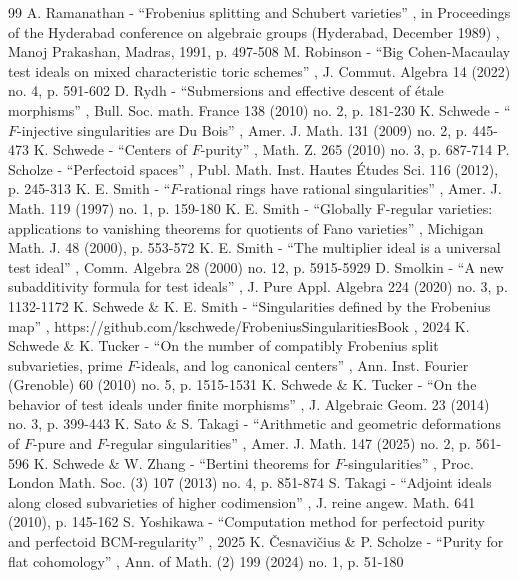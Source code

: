 \documentclass[11pt]{article}
\theoremstyle{plain}
\theoremstyle{definition}
\numberwithin{equation}{theorem}
\begin{document}
\begin{thebibliography}{99}
 A. Ramanathan - “Frobenius splitting and Schubert varieties” , in Proceedings of the Hyderabad conference on algebraic groups (Hyderabad, December 1989) , Manoj Prakashan, Madras, 1991, p. 497-508
 M. Robinson - “Big Cohen-Macaulay test ideals on mixed characteristic toric schemes” , J. Commut. Algebra 14 (2022) no. 4, p. 591-602
 D. Rydh - “Submersions and effective descent of étale morphisms” , Bull. Soc. math. France 138 (2010) no. 2, p. 181-230
 K. Schwede - “$F$-injective singularities are Du Bois” , Amer. J. Math. 131 (2009) no. 2, p. 445-473
 K. Schwede - “Centers of $F$-purity” , Math. Z. 265 (2010) no. 3, p. 687-714
 P. Scholze - “Perfectoid spaces” , Publ. Math. Inst. Hautes Études Sci. 116 (2012), p. 245-313
 K. E. Smith - “$F$-rational rings have rational singularities” , Amer. J. Math. 119 (1997) no. 1, p. 159-180
 K. E. Smith - “Globally F-regular varieties: applications to vanishing theorems for quotients of Fano varieties” , Michigan Math. J. 48 (2000), p. 553-572
 K. E. Smith - “The multiplier ideal is a universal test ideal” , Comm. Algebra 28 (2000) no. 12, p. 5915-5929
 D. Smolkin - “A new subadditivity formula for test ideals” , J. Pure Appl. Algebra 224 (2020) no. 3, p. 1132-1172
 K. Schwede \& K. E. Smith - “Singularities defined by the Frobenius map” , https://github.com/kschwede/FrobeniusSingularitiesBook , 2024
 K. Schwede \& K. Tucker - “On the number of compatibly Frobenius split subvarieties, prime $F$-ideals, and log canonical centers” , Ann. Inst. Fourier (Grenoble) 60 (2010) no. 5, p. 1515-1531
 K. Schwede \& K. Tucker - “On the behavior of test ideals under finite morphisms” , J. Algebraic Geom. 23 (2014) no. 3, p. 399-443
 K. Sato \& S. Takagi - “Arithmetic and geometric deformations of $F$-pure and $F$-regular singularities” , Amer. J. Math. 147 (2025) no. 2, p. 561-596
 K. Schwede \& W. Zhang - “Bertini theorems for $F$-singularities” , Proc. London Math. Soc. (3) 107 (2013) no. 4, p. 851-874
 S. Takagi - “Adjoint ideals along closed subvarieties of higher codimension” , J. reine angew. Math. 641 (2010), p. 145-162
 S. Yoshikawa - “Computation method for perfectoid purity and perfectoid BCM-regularity” , 2025
 K. Česnavičius \& P. Scholze - “Purity for flat cohomology” , Ann. of Math. (2) 199 (2024) no. 1, p. 51-180
\end{thebibliography}
\end{document}
